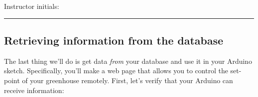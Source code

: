 \documentclass[11pt]{article} %
\begin{document}
\vspace{0.25in}
Instructor initials: \rule{2in}{0.4pt}
\vspace{0.25in}

%
%
%
%

\subsection*{Retrieving information from the database}

The last thing we'll do is get data \emph{from} your database and use it in your Arduino sketch. Specifically, you'll make a web page that allows you to control the set-point of your greenhouse remotely. First, let's verify that your Arduino can receive information:
\end{document}

